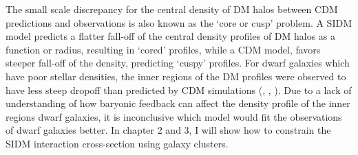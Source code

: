 The small scale discrepancy for the central density of DM halos between CDM
predictions and observations is also known as the `core or cusp' problem.   
A SIDM model predicts a flatter fall-off of the central density profiles of DM
halos as a function or radius,
resulting in `cored' profiles, while a CDM model, favors steeper fall-off of
the density, predicting `cuspy' profiles. 
For dwarf galaxies which have poor
stellar densities, the inner regions of the DM profiles were observed to have less 
steep dropoff than predicted by CDM simulations (\citealt{Rocha2013a},
\citealt{Peter2013b}, \citealt{Buckley2014}). Due to a lack of 
understanding of 
how baryonic feedback can affect the density profile of the inner regions 
dwarf galaxies, it is inconclusive which model would fit the observations of dwarf
galaxies better. In chapter 2 and 3, I will show how to constrain the SIDM interaction 
cross-section using galaxy clusters. 

